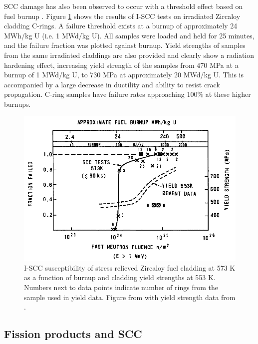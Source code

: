 SCC damage has also been observed to occur with a threshold effect based on fuel burnup \cite{Wood1974}. Figure \ref{figure:SCCthreshold} shows the results of I-SCC tests on irradiated Zircaloy cladding C-rings. A failure threshold exists at a burnup of approximately 24 MWh/kg U (i.e. 1 MWd/kg U). All samples were loaded and held for 25 minutes, and the failure fraction was plotted against burnup. Yield strengths of samples from the same irradiated claddings are also provided and clearly show a radiation hardening effect, increasing yield strength of the samples from 470 MPa at a burnup of 1 MWd/kg U, to 730 MPa at approximately 20 MWd/kg U. This is accompanied by a large decrease in ductility and ability to resist crack propagation. C-ring samples have failure rates approaching 100\% at these higher burnups.

\begin{figure}[ht] %
\centering
\includegraphics[width=14cm]{images/SCCthreshold.png}
\caption[I-SCC susceptibility of stress relieved Zircaloy fuel cladding at 573 K as a function of burnup and cladding yield strengths at 553 K. Numbers next to data points indicate number of rings from the sample used in yield data.]{I-SCC susceptibility of stress relieved Zircaloy fuel cladding at 573 K as a function of burnup and cladding yield strengths at 553 K. Numbers next to data points indicate number of rings from the sample used in yield data. Figure from \cite{bcoxpelletclad1990} with yield strength data from \cite{Bement1964}.}
\label{figure:SCCthreshold}
\end{figure}

\subsection{Fission products and SCC}

